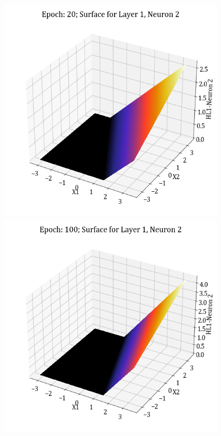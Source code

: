 \documentclass[11pt,a4paper]{article}
\begin{document}
\begin{figure}[H]
    \includegraphics[scale=0.4]{images/1B_MLFFNN_E20_HL1_N2.png}
    \includegraphics[scale=0.4]{images/1B_MLFFNN_E100_HL1_N2.png}

\end{figure}
\end{document}
